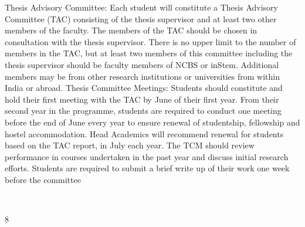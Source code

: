 \documentclass[a4paper,10pt]{article}
\begin{document}
Thesis Advisory Committee: Each student will constitute a Thesis Advisory Committee
(TAC) consisting of the thesis supervisor and at least two other members of the faculty. The
members of the TAC should be chosen in consultation with the thesis supervisor. There is
no upper limit to the number of members in the TAC, but at least two members of this
committee including the thesis supervisor should be faculty members of NCBS or inStem.
Additional members may be from other research institutions or universities from within
India or abroad.
Thesis Committee Meetings: Students should constitute and hold their first meeting with
the TAC by June of their first year. From their second year in the programme, students are
required to conduct one meeting before the end of June every year to ensure renewal of
studentship, fellowship and hostel accommodation. Head Academics will recommend
renewal for students based on the TAC report, in July each year. The TCM should review
performance in courses undertaken in the past year and discuss initial research efforts.
Students are required to submit a brief write up of their work one week before the committee
	
  

8	
  
\end{document}
